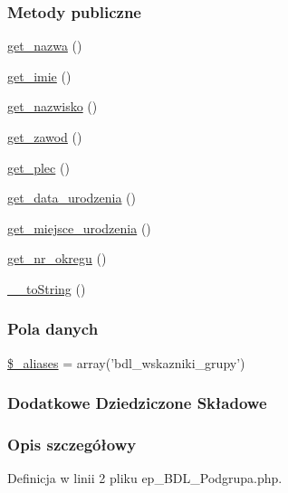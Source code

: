 \subsubsection*{Metody publiczne}
\begin{DoxyCompactItemize}
\item 
\hyperlink{classep___b_d_l___grupa_ac0818f0049d7b84f08f77128f54cee36}{get\-\_\-nazwa} ()
\item 
\hyperlink{classep___b_d_l___grupa_ac4b0c85dc2a130038f2d118dbd0c3d77}{get\-\_\-imie} ()
\item 
\hyperlink{classep___b_d_l___grupa_abdd1d7ff92508da7f748ba1feec97af0}{get\-\_\-nazwisko} ()
\item 
\hyperlink{classep___b_d_l___grupa_af80ca8310b60004454dd02a387deaa2c}{get\-\_\-zawod} ()
\item 
\hyperlink{classep___b_d_l___grupa_ac7f9af5c3fa024e4c26a7b6bd4ce4bb4}{get\-\_\-plec} ()
\item 
\hyperlink{classep___b_d_l___grupa_a880b240cd2d8c336fd1709bf0cb1ae2c}{get\-\_\-data\-\_\-urodzenia} ()
\item 
\hyperlink{classep___b_d_l___grupa_ac57c08ec5e394a19c5bd9280c8376182}{get\-\_\-miejsce\-\_\-urodzenia} ()
\item 
\hyperlink{classep___b_d_l___grupa_a2645a9f0aa5b0ccc482943348c033d0a}{get\-\_\-nr\-\_\-okregu} ()
\item 
\hyperlink{classep___b_d_l___grupa_a7516ca30af0db3cdbf9a7739b48ce91d}{\-\_\-\-\_\-to\-String} ()
\end{DoxyCompactItemize}
\subsubsection*{Pola danych}
\begin{DoxyCompactItemize}
\item 
\hyperlink{classep___b_d_l___grupa_ab4e31d75f0bc5d512456911e5d01366b}{\$\-\_\-aliases} = array('bdl\-\_\-wskazniki\-\_\-grupy')
\end{DoxyCompactItemize}
\subsubsection*{Dodatkowe Dziedziczone Składowe}


\subsubsection{Opis szczegółowy}


Definicja w linii 2 pliku ep\-\_\-\-B\-D\-L\-\_\-\-Podgrupa.\-php.



